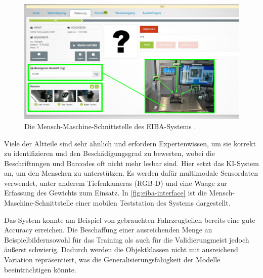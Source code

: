 \begin{figure}[b!]
	\centering
	\includegraphics[width=\textwidth]{figure_eiba_interface.png}
	\caption[Die Mensch-Maschine-Schnittstelle des EIBA-Systems.]{Die Mensch-Maschine-Schnittstelle des EIBA-Systems \parencite{Wagner2022reziprok}.}
	\label{fig:eiba-interface}
\end{figure}

Viele der Altteile sind sehr ähnlich und erfordern Expertenwissen, um sie korrekt zu identifizieren und den Beschädigungsgrad zu bewerten, wobei die Beschriftungen und Barcodes oft nicht mehr lesbar sind. Hier setzt das KI-System an, um den Menschen zu unterstützen. Es werden dafür multimodale Sensordaten verwendet, unter anderem Tiefenkameras (RGB-D) und eine Waage zur Erfassung des Gewichts zum Einsatz. In \autoref{fig:eiba-interface} ist die Mensch-Maschine-Schnittstelle einer mobilen Teststation des Systems dargestellt.

Das System konnte am Beispiel von gebrauchten Fahrzeugteilen bereits eine gute Accuracy erreichen. Die Beschaffung einer ausreichenden Menge an Beispielbildern\textemdash sowohl für das Training als auch für die Validierung\textemdash meist jedoch äußerst schwierig. Dadurch werden die Objektklassen nicht mit ausreichend Variation repräsentiert, was die Generalisierungsfähigkeit der Modelle beeinträchtigen könnte.

